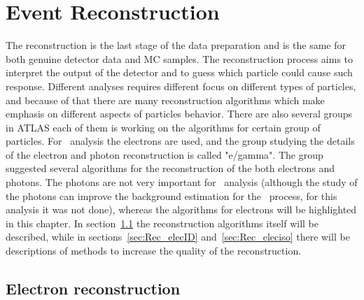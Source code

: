 \chapter{Event Reconstruction}
\label{sec:Reconstruction}

The reconstruction is the last stage of the data preparation and is the same for both genuine detector data and MC samples. The reconstruction process aims to interpret the output of the detector and to guess which particle could cause such response. Different analyses requires different focus on different types of particles, and because of that there are many reconstruction algorithms which make emphasis on different aspects of particles behavior. There are also several groups in ATLAS each of them is working on the algorithms for certain group of particles. For \Zee\ analysis the electrons are used, and the group studying the details of the electron and photon reconstruction is called "e/gamma". The group suggested several algorithms for the reconstruction of the both electrons and photons. The photons are not very important for \Zee\ analysis (although the study of the photons can improve the background estimation for the \Zee\ process, for this analysis it was not done), whereas the algorithms for electrons will be highlighted in this chapter. In section~\ref{sec:Rec_elec} the reconstruction algorithms itself will be described, while in sections~\ref{sec:Rec_elecID} and~\ref{sec:Rec_eleciso} there will be descriptions of methods to increase the quality of the reconstruction.

\section{Electron reconstruction}
\label{sec:Rec_elec}

